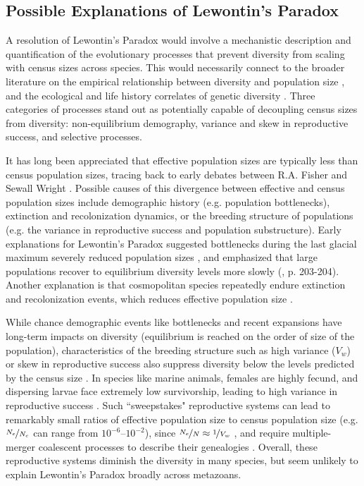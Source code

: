 \documentclass[11pt]{article}
\begin{document}
\subsection*{Possible Explanations of Lewontin's Paradox}

A resolution of Lewontin's Paradox would involve a mechanistic description and
quantification of the evolutionary processes that prevent diversity from
scaling with census sizes across species. This would necessarily connect to the
broader literature on the empirical relationship between diversity and
population size
\parencite{Frankham1996-yb,Nei1984-zi,Soule1976-he,Leroy2021-gy}, and the
ecological and life history correlates of genetic diversity
\parencite{Nevo1978-wh,Powell1975-lg,Nevo1984-hp}. Three categories of
processes stand out as potentially capable of decoupling census sizes from
diversity: non-equilibrium demography, variance and skew in reproductive
success, and selective processes.

It has long been appreciated that effective population sizes are typically less
than census population sizes, tracing back to early debates between R.A. Fisher
and Sewall Wright \parencite{Fisher1947-tf,Wright1948-fj}. Possible causes of
this divergence between effective and census population sizes include
demographic history (e.g. population bottlenecks), extinction and
recolonization dynamics, or the breeding structure of populations (e.g. the
variance in reproductive success and population substructure). Early
explanations for Lewontin's Paradox suggested bottlenecks during the last
glacial maximum severely reduced population sizes
\parencite{Kimura1984-ia,Ohta1973-pk,Nei1984-zi}, and emphasized that large
populations recover to equilibrium diversity levels more slowly
(\cite{Nei1984-zi}, \cite{Kimura1984-ia} p. 203-204). Another explanation is
that cosmopolitan species repeatedly endure extinction and recolonization
events, which reduces effective population size
\parencite{Maruyama1980-xz,Slatkin1977-kd}. 

While chance demographic events like bottlenecks and recent expansions have
long-term impacts on diversity (equilibrium is reached on the order of size of
the population), characteristics of the breeding structure such as high
variance ($V_w$) or skew in reproductive success  also suppress diversity below
the levels predicted by the census size \parencite{Wright1938-tv}. In species
like marine animals, females are highly fecund, and dispersing larvae face
extremely low survivorship, leading to high variance in reproductive success
\parencite{Waples2018-kb,Waples2013-wi,Hedgecock2011-ku,Hauser2008-fd}. Such
``sweepstakes" reproductive systems can lead to remarkably small ratios of
effective population size to census population size (e.g. $\nicefrac{N_e}{N_c}$
can range from $10^{-6}$--$10^{-2}$), since $\nicefrac{N_e}{N} \approx
\nicefrac{1}{V_w}$
\parencite{Hedgecock1994-gs,Wright1938-tv,Nunney1993-ef,Nunney1996-wy}, and
require multiple-merger coalescent processes  to describe their genealogies
\parencite{Eldon2006-ui}. Overall, these reproductive systems diminish the
diversity in many species, but seem unlikely to explain Lewontin's Paradox
broadly across metazoans.
\end{document}
